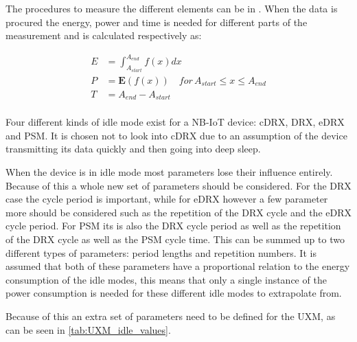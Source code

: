 The procedures to measure the different elements can be in . When the data is procured the energy, power and time is needed for different parts of the measurement and is calculated respectively as:

\begin{align}
E &= \int_{A_{start}}^{A_{end}} f(x) dx \label{eq:energy}\\
P &= \mathbf{E}(f(x)) \quad for \, A_{start} \leq x \leq A_{end} \label{eq:power} \\
T &=  A_{end} - A_{start} \label{eq:time}\\
\end{align}
\begin{where}
\end{where}

Four different kinds of idle mode exist for a NB-IoT device: \gls{cDRX}, \gls{DRX}, \gls{eDRX} and \gls{PSM}. It is chosen not to look into \gls{cDRX} due to an assumption of the device transmitting its data quickly and then going into deep sleep. 

When the device is in idle mode most parameters lose their influence entirely. Because of this a whole new set of parameters should be considered. For the \gls{DRX} case the cycle period is important, while for \gls{eDRX} however a few parameter more should be considered such as the repetition of the DRX cycle and the eDRX cycle period. For \gls{PSM} its is also the DRX cycle period as well as the repetition of the DRX cycle as well as the PSM cycle time. This can be summed up to two different types of parameters: period lengths and repetition numbers. It is assumed that both of these parameters have a proportional relation to the energy consumption of the idle modes, this means that only a single instance of the power consumption is needed for these different idle modes to extrapolate from.

Because of this an extra set of parameters need to be defined for the UXM, as can be seen in \autoref{tab:UXM_idle_values}.

